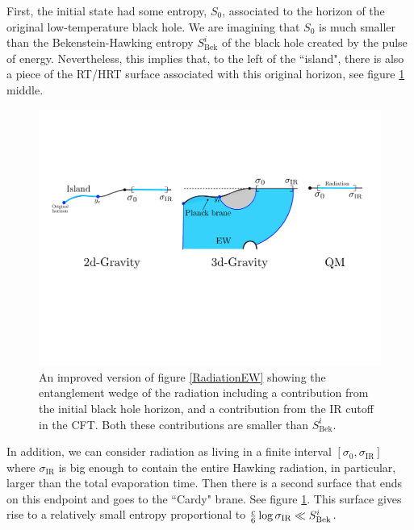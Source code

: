 \documentclass[11pt]{article}
\begin{document}
First, the initial state had some entropy, $S_0$, associated to the horizon of the original low-temperature black hole. 
We are imagining that $S_0$ is much smaller than the Bekenstein-Hawking entropy $S^i_{\text{Bek}}$ of the black hole created by the pulse of energy.
Nevertheless, this implies that, to the left of the ``island", there is also a piece of the RT/HRT surface associated with this original horizon, see figure \ref{RaditionEWBetter} middle.
   
\begin{figure}[ht]
    \begin{center}
    \includegraphics[scale=.47]{Figures/RadiationEWBetter}
    \end{center}
    \caption{An improved version of figure \ref{RadiationEW} showing the entanglement wedge of the radiation including a contribution from the initial black hole horizon, and a contribution from the IR cutoff in the CFT. 
    Both these contributions are smaller than $S^i_\text{Bek}$.}
    \label{RaditionEWBetter}
\end{figure}

In addition, we can consider radiation as living in a finite interval $[\sigma_0 ,\sigma_{\text{IR}}]$ where $\sigma_{\text{IR}}$ is big enough to contain the entire Hawking radiation, in particular, larger than the total evaporation time.
Then there is a second surface that ends on this endpoint and goes to the ``Cardy" brane.
See figure  \ref{RaditionEWBetter}.
This surface gives rise to a relatively small entropy proportional to ${c \over 6 } \log \sigma_{\text{IR}} \ll S^i_{\rm Bek}$.
   
\end{document}
